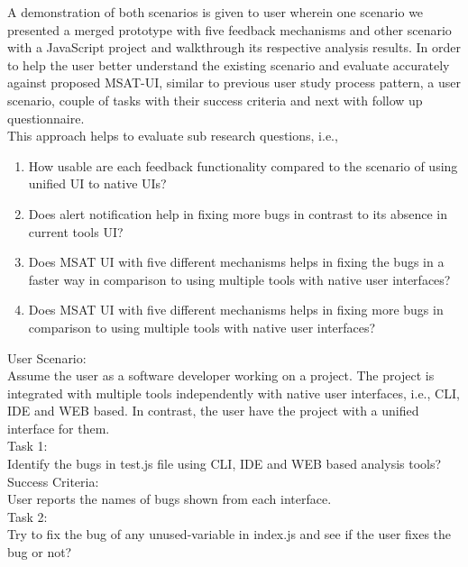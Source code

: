 A demonstration of both scenarios is given to user wherein one scenario we presented a merged prototype with five feedback mechanisms and other scenario with a JavaScript project and walkthrough its respective analysis results. In order to help the user better understand the existing scenario and evaluate accurately against proposed MSAT-UI, similar to previous user study process pattern, a user scenario, couple of tasks with their success criteria and next with follow up questionnaire. \\

This approach helps to evaluate sub research questions, i.e., \\

\begin{enumerate}
\item How usable are each feedback functionality compared to the scenario of using unified UI to native UIs?
\item Does alert notification help in fixing more bugs in contrast to its absence in current tools UI?
\item Does MSAT UI with five different mechanisms helps in fixing the bugs in a faster way in comparison to using multiple tools with native user interfaces?
\item Does MSAT UI with five different mechanisms helps in fixing more bugs in comparison to using multiple tools with native user interfaces?
\end{enumerate}

User Scenario: \\

Assume the user as a software developer working on a project. The project is integrated with multiple tools independently with native user interfaces, i.e., CLI, IDE and WEB based. In contrast, the user have the project with a unified interface for them. \\

Task 1: \\

Identify the bugs in test.js file using CLI, IDE and WEB based analysis tools? \\

Success Criteria: \\

User reports the names of bugs shown from each interface. \\


Task 2: \\

Try to fix the bug of any unused-variable in index.js and see if the user fixes the bug or not? \\

